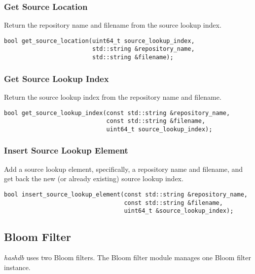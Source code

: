 \documentclass[12pt,twoside]{article}
\newcommand{\hdb}{\emph{hashdb}\xspace}
\begin{document}
\subsubsection{Get Source Location}
Return the repository name and filename from the source lookup index.
\begin{small}
\begin{verbatim}
bool get_source_location(uint64_t source_lookup_index,
                         std::string &repository_name,
                         std::string &filename);
\end{verbatim}
\end{small}

\subsubsection{Get Source Lookup Index}
Return the source lookup index from the repository name and filename.
\begin{small}
\begin{verbatim}
bool get_source_lookup_index(const std::string &repository_name,
                             const std::string &filename,
                             uint64_t source_lookup_index);
\end{verbatim}
\end{small}

\subsubsection{Insert Source Lookup Element}
Add a source lookup element, specifically, a repository name and filename,
and get back the new (or already existing) source lookup index.
\begin{small}
\begin{verbatim}
bool insert_source_lookup_element(const std::string &repository_name,
                                  const std::string &filename,
                                  uint64_t &source_lookup_index);
\end{verbatim}
\end{small}

\subsection{Bloom Filter}
\hdb uses two Bloom filters.
The Bloom filter module manages one Bloom filter instance.

\end{document}
